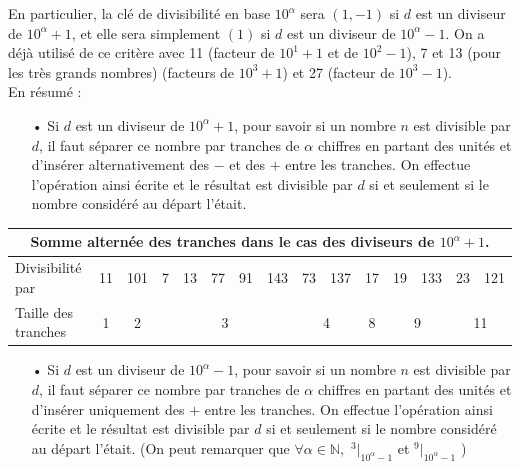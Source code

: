 \documentclass[a4paper]{article}
\begin{document}
	En particulier, la clé de divisibilité en base $10^\alpha$ sera $(1, -1)$ si $d$ est un diviseur de $10^\alpha + 1$, et elle sera simplement $(1)$ si $d$ est un diviseur de $10^\alpha - 1$. On a déjà utilisé de ce critère avec 11 (facteur de $10^1 + 1$ et de $10^2 - 1$), 7 et 13 (pour les très grands nombres) (facteurs de $10^3 + 1$) et 27 (facteur de $10^3 - 1$).\\

{ \parindent=0.5cm En résumé : }

\begin{itemize}

	\item[•] Si $d$ est un diviseur de $10^\alpha + 1$, pour savoir si un nombre $n$ est divisible par $d$, il faut séparer ce nombre par tranches de $\alpha$ chiffres en partant des unités et d'insérer alternativement des $-$ et des $+$ entre les tranches. On effectue l'opération ainsi écrite et le résultat est divisible par $d$ si et seulement si le nombre considéré au départ l'était.
	
	\vspace{0.2cm}

\end{itemize}
	
	{ \noindent
	\begin{tabular}{|l|c|c|c|c|c|c|c|c|c|c|c|c|c|c|}
		\multicolumn{15}{c}{{\small \textbf{Somme alternée des tranches dans le cas des diviseurs de {\boldmath $10^\alpha + 1$}.}}} \\
		\hline 
		Divisibilité par & \footnotesize 11 & \footnotesize 101 & \footnotesize 7 & \footnotesize 13 & \footnotesize 77 & \footnotesize 91 & \footnotesize 143 & \footnotesize 73 & \footnotesize 137 & \footnotesize 17 & \footnotesize 19 & \footnotesize 133 & \footnotesize 23 & \footnotesize 121 \\ 
		\hline 
		Taille des tranches & 1 & 2 & \multicolumn{5}{c|}{3} & \multicolumn{2}{c|}{4} & 8 & \multicolumn{2}{c|}{9} & \multicolumn{2}{c|}{11} \\ 
\hline 
\end{tabular} }


\vspace{1cm}


\begin{itemize}

	\item[•] Si $d$ est un diviseur de $10^\alpha - 1$, pour savoir si un nombre $n$ est divisible par $d$, il faut séparer ce nombre par tranches de $\alpha$ chiffres en partant des unités et d'insérer uniquement des $+$ entre les tranches. On effectue l'opération ainsi écrite et le résultat est divisible par $d$ si et seulement si le nombre considéré au départ l'était. (On peut remarquer que $\forall \alpha \in \mathbb{N},$ {\large $^{3}|_{10^\alpha - 1}$} et {\large $^{9}|_{10^\alpha - 1}$} \big)
	
	\vspace{0.2cm}

\end{itemize}
	
\end{document}
